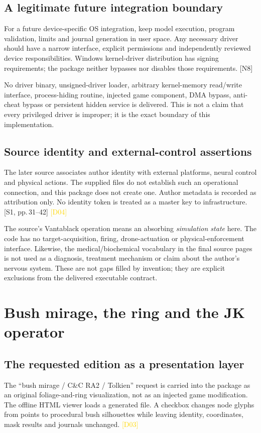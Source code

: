 \documentclass[11pt,a4paper]{article}
\newcommand{\src}[2]{\textcolor{muted}{[#1, #2]}}
\newcommand{\ext}[1]{\textcolor{muted}{[N#1]}}
\newcommand{\corr}[1]{\textcolor{gold}{\textsf{[#1]}}}
\newcommand{\code}[1]{\texttt{\detokenize{#1}}}
\begin{document}
\subsection{A legitimate future integration boundary}
For a future device-specific OS integration, keep model execution, program validation, limits and journal generation in user space. Any necessary driver should have a narrow interface, explicit permissions and independently reviewed device responsibilities. Windows kernel-driver distribution has signing requirements; the package neither bypasses nor disables those requirements. \ext{8}

No driver binary, unsigned-driver loader, arbitrary kernel-memory read/write interface, process-hiding routine, injected game component, DMA bypass, anti-cheat bypass or persistent hidden service is delivered. This is not a claim that every privileged driver is improper; it is the exact boundary of this implementation.

\subsection{Source identity and external-control assertions}
The later source associates author identity with external platforms, neural control and physical actions. The supplied files do not establish such an operational connection, and this package does not create one. Author metadata is recorded as attribution only. No identity token is treated as a master key to infrastructure. \src{S1}{pp.\,31--42} \corr{D04}

The source's Vantablack operation means an absorbing \emph{simulation state} here. The code has no target-acquisition, firing, drone-actuation or physical-enforcement interface. Likewise, the medical/biochemical vocabulary in the final source pages is not used as a diagnosis, treatment mechanism or claim about the author's nervous system. These are not gaps filled by invention; they are explicit exclusions from the delivered executable contract.
\clearpage

\section{Bush mirage, the ring and the JK operator}
\subsection{The requested edition as a presentation layer}
The ``bush mirage / C\&C RA2 / Tolkien'' request is carried into the package as an original foliage-and-ring visualization, not as an injected game modification. The offline HTML viewer loads a generated \code{frames.json} file. A checkbox changes node glyphs from points to procedural bush silhouettes while leaving identity, coordinates, mask results and journals unchanged. \corr{D03}
\end{document}
